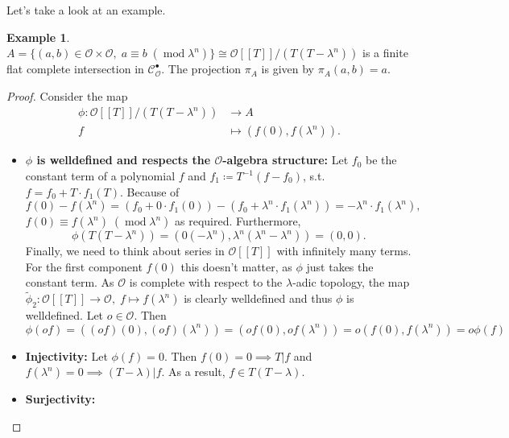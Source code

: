 \documentclass{article}
\theoremstyle{plain}%
\theoremstyle{definition}
\newtheorem{example}{Example}[section]
\theoremstyle{remark}
\newcommand{\cob}{\mathcal{C}_\mathcal{O}^\bullet}
\begin{document}
Let's take a look at an example.
\begin{example}\label{ex:first_1}\cite[cf.][example 1]{darmon1995fermat}
    \(A = \{(a,b) \in \mathcal{O}\times\mathcal{O},\; a \equiv b\; (\operatorname{mod} \lambda^n)\} 
    \cong \mathcal{O}[[T]]/(T(T-\lambda^n))\) is a finite flat complete intersection in \(\cob\).
    The projection \(\pi_A\) is given by \(\pi_A(a,b) = a\).
    \begin{proof}
        Consider the map
        \begin{align*}
            \phi\colon \mathcal{O}[[T]]/(T(T-\lambda^n)) &\to A\\
            f &\mapsto (f(0), f(\lambda^n)).
        \end{align*}
        \begin{itemize}
            \item \textbf{\(\phi\) is welldefined and respects the \(\mathcal{O}\)-algebra structure:}
                Let \(f_0\) be the constant term of a polynomial \(f\) and \(f_1 \coloneqq T^{-1}(f-f_0)\), 
                s.t. \(f = f_0 + T\cdot f_1(T)\). Because of
                \[
                    f(0) - f(\lambda^n) 
                    = (f_0 + 0\cdot f_1(0)) - (f_0 + \lambda^n \cdot f_1(\lambda^n)) 
                    = -\lambda^n \cdot f_1(\lambda^n),
                \]
                \(f(0) \equiv f(\lambda^n)\; (\operatorname{mod} \lambda^n)\) as required.
                Furthermore, \[\phi(T(T-\lambda^n)) = (0(-\lambda^n), \lambda^n(\lambda^n - \lambda^n)) = (0,0).\]
                Finally, we need to think about series in \(\mathcal{O}[[T]]\) with infinitely many terms.
                For the first component \(f(0)\) this doesn't matter, as \(\phi\) just takes the constant term. 
                As \(\mathcal{O}\) is complete with respect to the \(\lambda\)-adic topology, 
                the map \(\tilde\phi_2\colon \mathcal{O}[[T]] \to \mathcal{O},\; f \mapsto f(\lambda^n)\) 
                is clearly welldefined and thus \(\phi\) is welldefined.
                Let \(o \in \mathcal{O}\). Then 
                \[\phi(of) = ((of)(0),(of)(\lambda^n)) = (of(0), of(\lambda^n)) = o(f(0), f(\lambda^n)) = o\phi(f)\]
            \item \textbf{Injectivity:}
                Let \(\phi(f) = 0\). Then \(f(0) = 0 \implies T | f\) and \(f(\lambda^n) = 0 \implies (T - \lambda) | f\).
                As a result, \(f \in T(T-\lambda)\).
            \item \textbf{Surjectivity:}

\end{itemize}
\end{proof}
\end{example}
\end{document}
